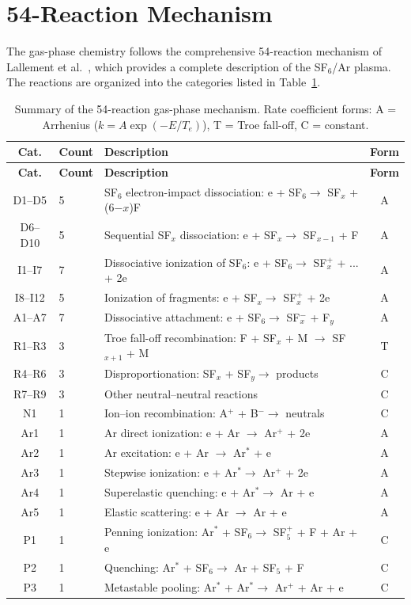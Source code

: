 \documentclass[11pt,a4paper]{report}
\newcommand{\Te}{T_e}
\begin{document}
\section{54-Reaction Mechanism}
\label{sec:reaction-mechanism}

The gas-phase chemistry follows the comprehensive 54-reaction mechanism of Lallement et al.~\cite{Lallement2009}, which provides a complete description of the SF$_6$/Ar plasma.  The reactions are organized into the categories listed in Table~\ref{tab:reactions}.

\begin{longtable}{clp{6cm}c}
\caption{Summary of the 54-reaction gas-phase mechanism.  Rate coefficient forms: A = Arrhenius ($k = A\exp(-E/\Te)$), T = Troe fall-off, C = constant.} \label{tab:reactions} \\
\toprule
\textbf{Cat.} & \textbf{Count} & \textbf{Description} & \textbf{Form} \\
\midrule
\endfirsthead
\toprule
\textbf{Cat.} & \textbf{Count} & \textbf{Description} & \textbf{Form} \\
\midrule
\endhead
D1--D5  & 5 & SF$_6$ electron-impact dissociation: e + SF$_6 \to$ SF$_x$ + (6$-x$)F & A \\
D6--D10 & 5 & Sequential SF$_x$ dissociation: e + SF$_x \to$ SF$_{x-1}$ + F & A \\
\midrule
I1--I7  & 7 & Dissociative ionization of SF$_6$: e + SF$_6 \to$ SF$_x^+$ + ... + 2e & A \\
I8--I12 & 5 & Ionization of fragments: e + SF$_x \to$ SF$_x^+$ + 2e & A \\
\midrule
A1--A7  & 7 & Dissociative attachment: e + SF$_6 \to$ SF$_x^-$ + F$_y$ & A \\
\midrule
R1--R3  & 3 & Troe fall-off recombination: F + SF$_x$ + M $\to$ SF$_{x+1}$ + M & T \\
R4--R6  & 3 & Disproportionation: SF$_x$ + SF$_y \to$ products & C \\
R7--R9  & 3 & Other neutral--neutral reactions & C \\
\midrule
N1      & 1 & Ion--ion recombination: A$^+$ + B$^- \to$ neutrals & C \\
\midrule
Ar1     & 1 & Ar direct ionization: e + Ar $\to$ Ar$^+$ + 2e & A \\
Ar2     & 1 & Ar excitation: e + Ar $\to$ Ar$^*$ + e & A \\
Ar3     & 1 & Stepwise ionization: e + Ar$^* \to$ Ar$^+$ + 2e & A \\
Ar4     & 1 & Superelastic quenching: e + Ar$^* \to$ Ar + e & A \\
Ar5     & 1 & Elastic scattering: e + Ar $\to$ Ar + e & A \\
\midrule
P1      & 1 & Penning ionization: Ar$^*$ + SF$_6 \to$ SF$_5^+$ + F + Ar + e & C \\
P2      & 1 & Quenching: Ar$^*$ + SF$_6 \to$ Ar + SF$_5$ + F & C \\
P3      & 1 & Metastable pooling: Ar$^*$ + Ar$^* \to$ Ar$^+$ + Ar + e & C \\
\bottomrule
\end{longtable}
\end{document}

